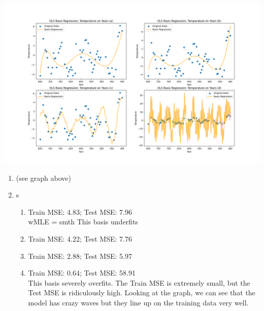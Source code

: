 \documentclass[submit]{harvardml}
\begin{document}
\newpage
\begin{solution}

\noindent 
\begin{center}
  \includegraphics[width=0.9\linewidth]{Problem3.png}
\end{center}
\begin{enumerate}
  \item (see graph above)
  \item s
    \begin{enumerate}
      \item Train MSE: 4.83; Test MSE: 7.96\\
      wMLE = smth
      This basis underfits
      \item Train MSE: 4.22; Test MSE: 7.76\\
      \item Train MSE: 2.88; Test MSE: 5.97\\
      \item Train MSE: 0.64; Test MSE: 58.91\\
      This basis severely overfits. The Train MSE is extremely small, 
      but the Test MSE is ridiculously high. Looking at the graph, we can see that 
      the model has crazy waves but they line up on the training data very well.
    \end{enumerate}
\end{enumerate}
\end{solution}
\newpage
\end{document}
